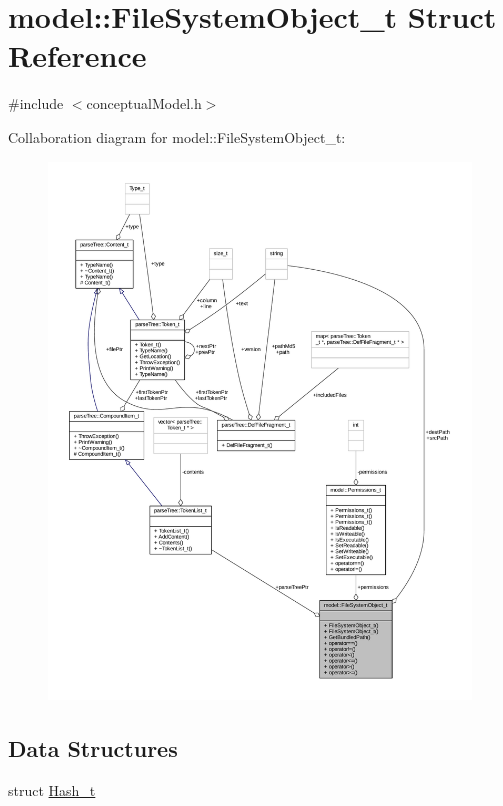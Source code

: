 \hypertarget{structmodel_1_1_file_system_object__t}{}\section{model\+:\+:File\+System\+Object\+\_\+t Struct Reference}
\label{structmodel_1_1_file_system_object__t}


{\ttfamily \#include $<$conceptual\+Model.\+h$>$}



Collaboration diagram for model\+:\+:File\+System\+Object\+\_\+t\+:
\nopagebreak
\begin{figure}[H]
\begin{center}
\leavevmode
\includegraphics[width=350pt]{structmodel_1_1_file_system_object__t__coll__graph}
\end{center}
\end{figure}
\subsection*{Data Structures}
\begin{DoxyCompactItemize}
\item 
struct \hyperlink{structmodel_1_1_file_system_object__t_1_1_hash__t}{Hash\+\_\+t}
\end{DoxyCompactItemize}
